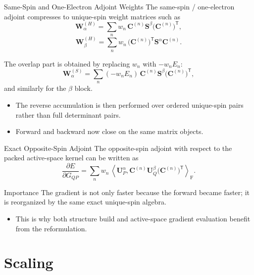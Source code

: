 \documentclass{beamer}
\newcommand{\Frob}[2]{\left\langle #1, #2 \right\rangle_{\mathrm F}}
\newcommand{\Cmat}{\mathbf{C}}
\newcommand{\Sa}{\mathbf{S}^{\alpha}}
\newcommand{\Sb}{\mathbf{S}^{\beta}}
\newcommand{\Ua}[1]{\mathbf{U}^{\alpha}_{#1}}
\begin{document}
\begin{frame}{Same-Spin and One-Electron Adjoint Weights}
  The same-spin / one-electron adjoint compresses to unique-spin weight
  matrices such as
  \[
  \mathbf W_{\alpha}^{(H)}
  =
  \sum_n w_n\, \Cmat^{(n)} \Sb \bigl(\Cmat^{(n)}\bigr)^{\mathsf T},
  \]
  \[
  \mathbf W_{\beta}^{(H)}
  =
  \sum_n w_n\, \bigl(\Cmat^{(n)}\bigr)^{\mathsf T} \Sa \Cmat^{(n)}.
  \]

  The overlap part is obtained by replacing $w_n$ with $-w_n E_n$:
  \[
  \mathbf W_{\alpha}^{(S)}
  =
  \sum_n (-w_n E_n)\, \Cmat^{(n)} \Sb \bigl(\Cmat^{(n)}\bigr)^{\mathsf T},
  \]
  and similarly for the $\beta$ block.

  \begin{itemize}
    \item The reverse accumulation is then performed over ordered unique-spin
          pairs rather than full determinant pairs.
    \item Forward and backward now close on the same matrix objects.
  \end{itemize}
\end{frame}

\begin{frame}{Exact Opposite-Spin Adjoint}
  The opposite-spin adjoint with respect to the packed active-space kernel can
  be written as
  \[
  \frac{\partial E}{\partial G_{QP}}
  =
  \sum_n w_n\,
  \Frob{
    \Ua{P}
  }{
    \Cmat^{(n)} \mathbf{U}^{\beta}_{Q}
    \bigl(\Cmat^{(n)}\bigr)^{\mathsf T}
  }.
  \]

  \begin{block}{Importance}
    The gradient is not only faster because the forward became faster; it is
    reorganized by the same exact unique-spin algebra.
  \end{block}

  \begin{itemize}
    \item This is why both structure build and active-space gradient evaluation
          benefit from the reformulation.
  \end{itemize}
\end{frame}

\section{Scaling}
\end{document}
